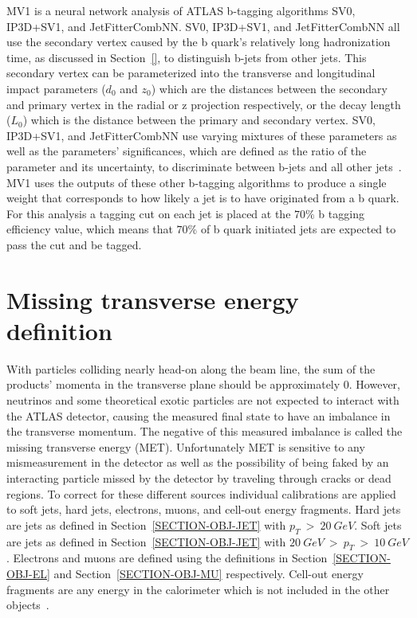 MV1 is a neural network analysis of ATLAS b-tagging algorithms SV0, IP3D+SV1, and JetFitterCombNN. SV0, IP3D+SV1, and JetFitterCombNN all use the secondary vertex caused by the b quark's relatively long hadronization time, as discussed in Section~\ref{}, to distinguish b-jets from other jets. This secondary vertex can be parameterized into the transverse and longitudinal impact parameters ($d_0$ and $z_0$) which are the distances between the secondary and primary vertex in the radial or z projection respectively, or the decay length ($L_0$) which is the distance between the primary and secondary vertex. SV0, IP3D+SV1, and JetFitterCombNN use varying mixtures of these parameters as well as the parameters' significances, which are defined as the ratio of the parameter and its uncertainty, to discriminate between b-jets and all other jets~\cite{BTAGGING}. MV1 uses the outputs of these other b-tagging algorithms to produce a single weight that corresponds to how likely a jet is to have originated from a b quark. For this analysis a tagging cut on each jet is placed at the $70\%$ b tagging efficiency value, which means that $70\%$ of b quark initiated jets are expected to pass the cut and be tagged.

\section{Missing transverse energy definition}
\label{SECTION-OBJ-MET}
With particles colliding nearly head-on along the beam line, the sum of the products' momenta in the transverse plane should be approximately 0. However, neutrinos and some theoretical exotic particles are not expected to interact with the ATLAS detector, causing the measured final state to have an imbalance in the transverse momentum. The negative of this measured imbalance is called the missing transverse energy (MET). Unfortunately MET is sensitive to any mismeasurement in the detector as well as the possibility of being faked by an interacting particle missed by the detector by traveling through cracks or dead regions. To correct for these different sources individual calibrations are applied to soft jets, hard jets, electrons, muons, and cell-out energy fragments. Hard jets are jets as defined in Section~\ref{SECTION-OBJ-JET} with $p_T\ >\ 20\ GeV$. Soft jets are jets as defined in Section~\ref{SECTION-OBJ-JET} with $20\ GeV\ >\ p_T\ >\ 10\ GeV$. Electrons and muons are defined using the definitions in Section~\ref{SECTION-OBJ-EL} and Section~\ref{SECTION-OBJ-MU} respectively. Cell-out energy fragments are any energy in the calorimeter which is not included in the other objects~\cite{MET}.


